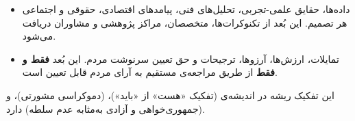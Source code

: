 \documentclass[12pt, a4paper, openright, twoside]{book}
\begin{document}
	\begin{itemize}[rightmargin=1em, leftmargin=0pt, itemsep=4pt]
		\item \textbf{}
		داده‌ها، حقایق علمی-تجربی، تحلیل‌های فنی، پیامدهای اقتصادی، حقوقی
		و اجتماعی هر تصمیم. این بُعد از تکنوکرات‌ها، متخصصان، مراکز پژوهشی
		و مشاوران دریافت می‌شود.
		
		\item \textbf{}
		تمایلات، ارزش‌ها، آرزوها، ترجیحات و حق تعیین سرنوشت مردم.
		این بُعد \textbf{فقط و فقط} از طریق مراجعه‌ی مستقیم به آرای مردم
		قابل تعیین است.
	\end{itemize}
	
	\vspace{0.5\baselineskip}
	\noindent
	\textbf{}
	این تفکیک ریشه در اندیشه‌ی  (تفکیک «هست» از «باید»)،
	 (دموکراسی مشورتی)،
	و  (جمهوری‌خواهی و آزادی به‌مثابه عدم سلطه) دارد.
	
\end{document}
